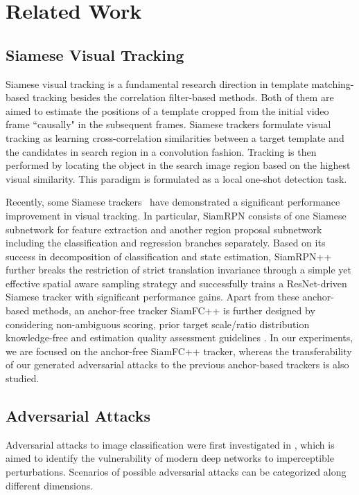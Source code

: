 \documentclass{article}
\begin{document}
\section{Related Work}

\subsection{Siamese Visual Tracking}

Siamese visual tracking is a fundamental research direction in template matching-based tracking besides the correlation filter-based methods. Both of them are aimed to estimate the positions of a template cropped from the initial video frame ``causally" in the subsequent frames. Siamese trackers formulate visual tracking as learning cross-correlation similarities between a target template and the candidates in search region in a convolution fashion. Tracking is then performed by locating the object in the search image region based on the highest visual similarity. This paradigm is  formulated as a local one-shot detection task.

Recently, some Siamese trackers~\cite{SiamRPN,SiamRPN++,SiamFC++} have demonstrated a significant performance improvement in visual tracking. 
In particular, SiamRPN \cite{SiamRPN} consists of one Siamese subnetwork for feature extraction and another region proposal subnetwork including the classification and regression branches separately. Based on its success in decomposition of classification and state estimation, SiamRPN++ \cite{SiamRPN++} further breaks the restriction of strict translation invariance through a simple yet effective spatial aware sampling strategy and successfully trains a ResNet-driven Siamese tracker with significant performance gains. Apart from these anchor-based methods, an anchor-free tracker SiamFC++ \cite{SiamFC++} is further designed by considering non-ambiguous scoring, prior target scale/ratio distribution knowledge-free and estimation quality assessment guidelines .
In our experiments, we are focused on the anchor-free SiamFC++ tracker, whereas the transferability of our generated adversarial attacks to the previous anchor-based trackers is also studied.

\subsection{Adversarial Attacks}

Adversarial attacks to image classification were first investigated in \cite{intriguing}, which is aimed to identify the vulnerability of modern deep networks to imperceptible perturbations. 
Scenarios of possible adversarial attacks can be categorized along different dimensions.
\end{document}

